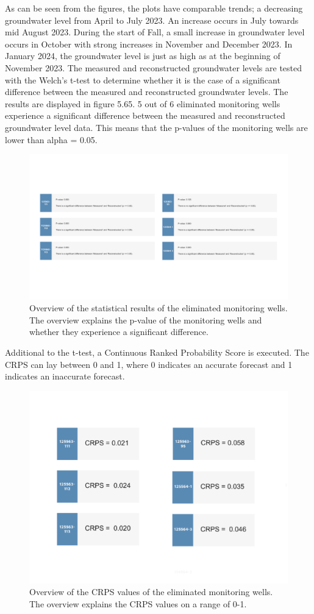 As can be seen from the figures, the plots have comparable trends; a decreasing groundwater level from April to July 2023. An increase occurs in July towards mid August 2023. During the start of Fall, a small increase in groundwater level occurs in October with strong increases in November and December 2023. In January 2024, the groundwater level is just as high as at the beginning of November 2023. 
\newline
\newline
The measured and reconstructed groundwater levels are tested with the Welch's t-test to determine whether it is the case of a significant difference between the measured and reconstructed groundwater levels. The results are displayed in figure 5.65.  5 out of 6 eliminated monitoring wells experience a significant difference between the measured and reconstructed groundwater level data. This means that the p-values of the monitoring wells are lower than alpha = 0.05.

\begin{figure}[htbp]
    \centering
    \includegraphics[width=0.70\linewidth]{T-TEST hij.png}
    \caption{Overview of the statistical results of the eliminated monitoring wells. The overview explains the p-value of the monitoring wells and whether they experience a significant difference.}
    \label{fig:enter-label}
\end{figure}

\clearpage
Additional to the t-test, a Continuous Ranked Probability Score is executed. The CRPS can lay between 0 and 1, where 0 indicates an accurate forecast and 1 indicates an inaccurate forecast.

\begin{figure}[htbp]
    \centering
    \includegraphics[width=0.70\linewidth]{crpsheij.png}
    \caption{Overview of the CRPS values of the eliminated monitoring wells. The overview explains the CRPS values on a range of 0-1.}
    \label{fig:enter-label}
\end{figure}

